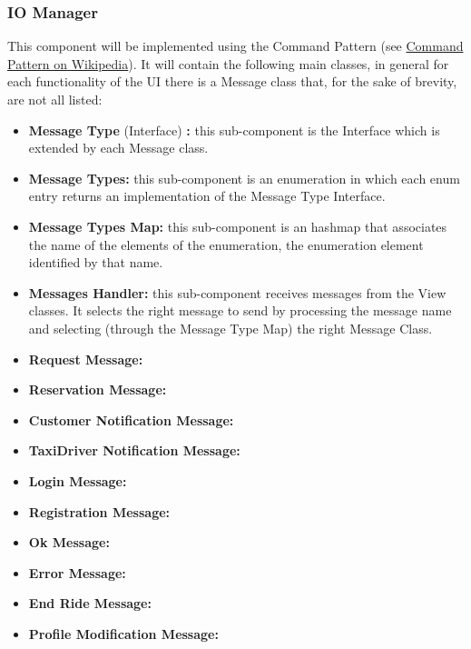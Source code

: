 \documentclass[../../../../../../../dd.tex]{subfiles}
\begin{document}
	\subsubsection{IO Manager}
		This component will be implemented using the Command Pattern (see \href{https://it.wikipedia.org/wiki/Command_pattern}{Command Pattern on Wikipedia}).
		It will contain the following main classes, in general for each functionality of the UI there is a Message class that, for the sake of brevity, are not all listed:
		\begin{itemize}
			\item \textbf{Message Type} (Interface) \textbf{:} this sub-component is the Interface which is extended by each Message class. 
			\item \textbf{Message Types:} this sub-component is an enumeration in which each enum entry returns an implementation of the Message Type Interface.
			\item \textbf{Message Types Map:} this sub-component is an hashmap that associates the name of the elements of the enumeration, the enumeration element identified by that name.
			\item \textbf{Messages Handler:} this sub-component receives messages from the View classes. It selects the right message to send by processing the message name and selecting (through the Message Type Map) the right Message Class.
			\item \textbf{Request Message:} %
			\item \textbf{Reservation Message:} %
			\item \textbf{Customer Notification Message:} %
			\item \textbf{TaxiDriver Notification Message:} %
			\item \textbf{Login Message:} %
			\item \textbf{Registration Message:} %
			\item \textbf{Ok Message:} %
			\item \textbf{Error Message:} %
			\item \textbf{End Ride Message:} %
			\item \textbf{Profile Modification Message:} %
		\end{itemize}
\end{document}
